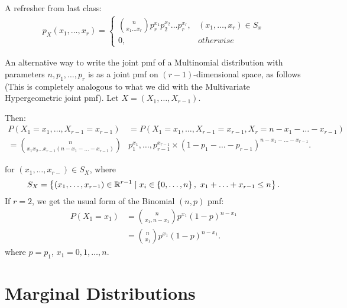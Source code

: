 A refresher from last class:
\begin{align*}
        p_{X}( x_{1} , … , x_{r} ) = \begin{cases}
                \binom{n }{x_1 \ldots x_{r}} p_r ^{x_1} p_{2} ^{x_2}… p_r ^{x_r}, & ( x_{1} ,\ldots , x_{r} ) \in  S_{x} \\
                0, & otherwise
        \end{cases}
\end{align*}

An alternative way to write the joint pmf of a Multinomial distribution with parameters $n, p_{1} , \ldots , p_{r}$ is as a joint pmf on $\left( r - 1 \right) $-dimensional space, as follows (This is completely analogous to what we did with the Multivariate Hypergeometric joint pmf). Let $X = \left( X_{1} , \ldots , X_{r-1} \right) $.

Then:
\begin{align*}
	P\left( X_1 = x_1, \ldots , X_{r-1} = x_{r - 1} \right) &=  P\left( X_1 = x_1, \ldots , X_{r-1} = x_{r - 1}, X_{r} = n - x_1 - \ldots - x_{r-1} \right) \\
	= \binom{n}{x_1 x_2 \ldots x_{r-1}\left( n - x_1 - \ldots - x_{r-1} \right) }&p^{x_{1}}_{1} , \ldots , p^{x_{r-1}}_{r-1} \times \left( 1 - p_1 - \ldots - p_{r-1} \right) ^{n - x_1 - \ldots - x_{r - 1}}
.\end{align*}

for $\left( x_{1} , \ldots , x_{r-} \right) \in  S_{X}$, where
\[
	S_{X} = \left\{ \left( x_{1} , \ldots , x_{r-1} \right) \in \mathbb{R}^{r - 1}  \mid x_{i}\in \left\{ 0, \ldots, n \right\} , \ x_{1} + \ldots + x_{r-1} \le  n \right\} 
.\] 
If $r = 2$, we get the usual form of the Binomial $\left( n, p \right) $ pmf:
\begin{align*}
	P\left( X_1 = x_1 \right) &= \binom{n}{x_1,  n - x_1 }  p^{x_1}\left( 1 - p \right) ^{n - x_1}\\
				  &= \binom{n }{x_1}p^{x_1}\left( 1 - p \right) ^{n - x_1}
.\end{align*}
where $p = p_1$, $x_1 = 0, 1, \ldots, n$.

\section{Marginal Distributions}

